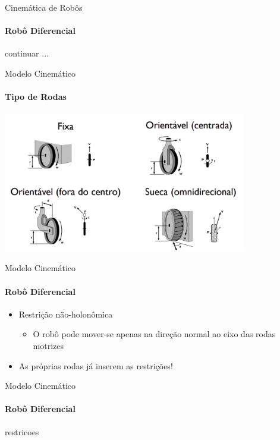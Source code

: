 \documentclass{beamer}
\begin{document}
\begin{frame}{Cinemática de Robôs}
    \framesubtitle{Robô Diferencial}

    continuar ...

\end{frame}



\begin{frame}{Modelo Cinemático}
    \framesubtitle{Tipo de Rodas}
    \begin{center}
        \includegraphics[width=0.8\textwidth]{../images/tipo_de_rodas.png}
    \end{center}
\end{frame}

\begin{frame}{Modelo Cinemático}
    \framesubtitle{Robô Diferencial}
    \begin{itemize}
        \item Restrição não-holonômica
              \begin{itemize}
                  \item O robô pode mover-se apenas na direção normal ao eixo das rodas motrizes
              \end{itemize}
        \item As próprias rodas já inserem as restrições!
    \end{itemize}
    \centering
    
\end{frame}


\begin{frame}{Modelo Cinemático}
    \framesubtitle{Robô Diferencial}
    restricoes

\end{frame}
\end{document}

